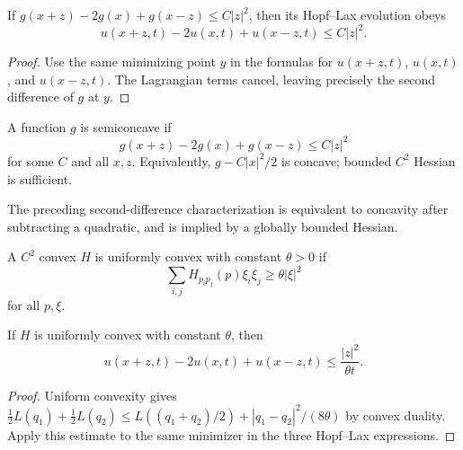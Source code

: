 \begin{lemma}[Semiconcavity]
\label{lem:hopf-lax-semiconcavity-from-data}
If $g(x+z)-2g(x)+g(x-z)\le C|z|^2$, then its Hopf--Lax evolution obeys
\[
u(x+z,t)-2u(x,t)+u(x-z,t)\le C|z|^2.
\]
\end{lemma}

\begin{proof}
\sketch Use the same minimizing point $y$ in the formulas for $u(x+z,t)$,
$u(x,t)$, and $u(x-z,t)$. The Lagrangian terms cancel, leaving precisely the
second difference of $g$ at $y$.
\end{proof}

\begin{definition}
\label{def:semiconcave-function}
A function $g$ is semiconcave if
\[
g(x+z)-2g(x)+g(x-z)\le C|z|^2
\]
for some $C$ and all $x,z$. Equivalently, $g-C|x|^2/2$ is concave; bounded
$C^2$ Hessian is sufficient.
\end{definition}

\begin{remark}
\label{rem:semiconcave-characterization}
The preceding second-difference characterization is equivalent to concavity
after subtracting a quadratic, and is implied by a globally bounded Hessian.
\end{remark}

\begin{definition}
\label{def:uniformly-convex-hamiltonian}
A $C^2$ convex $H$ is uniformly convex with constant $\theta>0$ if
\[
\sum_{i,j}H_{p_ip_j}(p)\xi_i\xi_j\ge\theta|\xi|^2
\]
for all $p,\xi$.
\end{definition}

\begin{lemma}
\label{lem:hopf-lax-semiconcavity-uniform-convexity}
If $H$ is uniformly convex with constant $\theta$, then
\[
u(x+z,t)-2u(x,t)+u(x-z,t)\le\frac{|z|^2}{\theta t}.
\]
\end{lemma}

\begin{proof}
\sketch Uniform convexity gives
$\frac12L(q_1)+\frac12L(q_2)\le L((q_1+q_2)/2)+|q_1-q_2|^2/(8\theta)$
by convex duality. Apply this estimate to the same minimizer in the three
Hopf--Lax expressions.
\end{proof}

